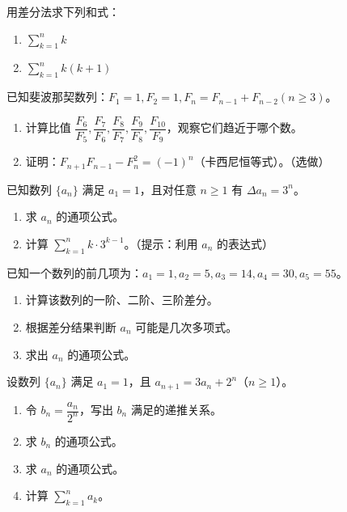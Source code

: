 \documentclass[fontset=fandol]{ctexart}
\begin{document}
\begin{exercise}用差分法求下列和式：
\begin{enumerate}
\item \(\sum_{k=1}^{n} k\)
\item \(\sum_{k=1}^{n} k(k+1)\)
\end{enumerate}
\end{exercise}

\begin{exercise}已知斐波那契数列：\(F_1 = 1, F_2 = 1, F_n = F_{n-1} + F_{n-2} (n \geq 3)\)。
\begin{enumerate}
\item 计算比值 \(\dfrac{F_6}{F_5}, \dfrac{F_7}{F_6}, \dfrac{F_8}{F_7}, \dfrac{F_9}{F_8}, \dfrac{F_{10}}{F_9}\)，观察它们趋近于哪个数。
\item 证明：\(F_{n+1}F_{n-1} - F_n^2 = (-1)^n\)（卡西尼恒等式）。（选做）
\end{enumerate}
\end{exercise}

\begin{exercise}已知数列 \(\{a_n\}\) 满足 \(a_1 = 1\)，且对任意 \(n \geq 1\) 有 \(\Delta a_n = 3^n\)。
\begin{enumerate}
\item 求 \(a_n\) 的通项公式。
\item 计算 \(\sum_{k=1}^{n} k \cdot 3^{k-1}\)。（提示：利用 \(a_n\) 的表达式）
\end{enumerate}
\end{exercise}

\begin{exercise}已知一个数列的前几项为：\(a_1 = 1, a_2 = 5, a_3 = 14, a_4 = 30, a_5 = 55\)。
\begin{enumerate}
\item 计算该数列的一阶、二阶、三阶差分。
\item 根据差分结果判断 \(a_n\) 可能是几次多项式。
\item 求出 \(a_n\) 的通项公式。
\end{enumerate}
\end{exercise}

\begin{exercise}[较难：递推与差分的综合应用]
设数列 \(\{a_n\}\) 满足 \(a_1 = 1\)，且 \(a_{n+1} = 3a_n + 2^n\)（\(n \geq 1\)）。
\begin{enumerate}
\item 令 \(b_n = \dfrac{a_n}{2^n}\)，写出 \(b_n\) 满足的递推关系。
\item 求 \(b_n\) 的通项公式。
\item 求 \(a_n\) 的通项公式。
\item 计算 \(\sum_{k=1}^{n} a_k\)。
\end{enumerate}
\end{exercise}
\end{document}
